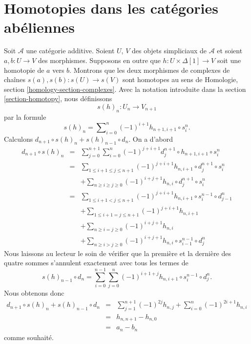 \section{Homotopies dans les catégories abéliennes}
\label{section-homotopy-abelian}

\noindent
Soit $\mathcal{A}$ une catégorie additive. Soient $U$, $V$ des objets
simpliciaux de $\mathcal{A}$ et soient $a, b : U \to V$ des morphismes.
Supposons en outre que $h : U \times \Delta[1] \to V$ soit une homotopie
de $a$ vers $b$. Montrons que les deux morphismes de complexes de chaînes
$s(a), s(b) : s(U) \longrightarrow s(V)$ sont homotopes au sens de
Homologie, section \ref{homology-section-complexes}.
Avec la notation introduite dans la section \ref{section-homotopy},
nous définissons
$$
s(h)_n : U_n \longrightarrow V_{n + 1}
$$
par la formule
\begin{equation}
\label{equation-homotopy-to-homotopy}
s(h)_n = \sum\nolimits_{i = 0}^n (-1)^{i + 1} h_{n + 1, i + 1} \circ s^n_i.
\end{equation}
Calculons $d_{n + 1} \circ s(h)_n + s(h)_{n - 1} \circ d_n$.
On a d'abord
\begin{eqnarray*}
d_{n + 1} \circ s(h)_n & = &
\sum\nolimits_{j = 0}^{n + 1}
\sum\nolimits_{i = 0}^n
(-1)^{j + i + 1}
d^{n + 1}_j \circ h_{n + 1, i + 1} \circ s^n_i \\
& = &
\sum\nolimits_{1 \leq i + 1 \leq j \leq n + 1}
(-1)^{j + i + 1}
h_{n, i + 1} \circ d^{n + 1}_j \circ s^n_i \\
& &
+
\sum\nolimits_{n \geq i \geq j \geq 0}
(-1)^{i + j + 1}
h_{n, i} \circ d^{n + 1}_j \circ s^n_i \\
& = &
\sum\nolimits_{1 \leq i + 1 < j \leq n + 1}
(-1)^{j + i + 1}
h_{n, i + 1} \circ s^{n - 1}_i \circ d^n_{j - 1} \\
& &
+
\sum\nolimits_{1 \leq i + 1 = j \leq n + 1}
(-1)^{j + i + 1}
h_{n, i + 1} \\
& &
+
\sum\nolimits_{n \geq i = j \geq 0}
(-1)^{i + j + 1}
h_{n, i} \\
& &
+
\sum\nolimits_{n \geq i > j \geq 0}
(-1)^{i + j + 1}
h_{n, i} \circ s^{n - 1}_{i - 1} \circ d^n_j
\end{eqnarray*}
Nous laissons au lecteur le soin de vérifier que la première et la dernière
des quatre sommes s'annulent exactement avec tous les termes de
$$
s(h)_{n - 1} \circ d_n
=
\sum_{i = 0}^{n - 1} \sum_{j = 0}^n
(-1)^{i + 1 + j} h_{n, i + 1} \circ s^{n - 1}_i \circ d^n_j.
$$
Nous obtenons donc
\begin{eqnarray*}
d_{n + 1} \circ s(h)_n + s(h)_{n - 1} \circ d_n
& = &
\sum_{j = 1}^{n + 1} (-1)^{2j} h_{n, j}
+
\sum_{i = 0}^n (-1)^{2i + 1} h_{n, i} \\
& = &
h_{n, n + 1} - h_{n , 0} \\
& = &
a_n - b_n
\end{eqnarray*}
comme souhaité.

